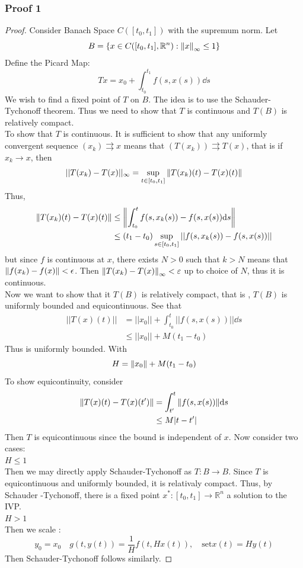 \documentclass[a4paper, 12pt]{book}
\begin{document}
\subsubsection{Proof 1}
\begin{proof}
	Consider Banach Space \( C([t_0,t_1]) \) with the supremum norm. Let \[
		B=\{x\in C([t_0,t_1], \mathbb{R}^n): \norm{x} _\infty \leq 1\}
	\]
	Define the Picard Map:
	\[
		Tx=x_0+\int_{t_0}^{t_1} f(s,x(s)) \dd s
	\]
	We wish to find a fixed point of \( T \) on \( B \). The idea is to use the Schauder-Tychonoff theorem. Thus we need to show that \( T \) is continuous and \( T(B) \) is relatively compact. \\

	To show that \( T \) is continuous. It is sufficient to show that any uniformly convergent sequence \( (x_k)\rightrightarrows x \) means that \( (T(x_k))
	\rightrightarrows T(x)\), that is if \( x_k \to x \), then
	\[
		||T(x_k)-T(x)||_\infty=\sup_{t\in[t_0, t_1]} \norm{T(x_k)(t)-T(x)(t)}
	\]
	Thus,
	\begin{align*}
		\norm{T(x_k)(t)-T(x)(t)} & \leq \norm{\int_{t_0}^{t} f(s,x_k(s))-f(s,x(s))\dd s}         \\
		                         & \leq (t_1-t_0) \sup_{s\in[t_0,t_1]} ||f(s,x_k(s))-f(s,x(s))||
	\end{align*}
	but since \( f \) is continuous at \( x \), there exists \( N>0 \) such that \( k>N \) means that \( \norm{f(x_k)-f(x)} <\epsilon \). Then \( \norm{T(x_k)-T(x)} _\infty < \varepsilon \) up to choice of \( N \), thus it is continuous. \\
	Now we want to show that it \( T(B) \) is relatively compact, that is , \( T(B) \) is uniformly bounded and equicontinuous. See that
	\begin{align*}
		||T(x)(t)|| & = ||x_0|| + \int_{t_0}^{t} ||f(s, x(s))||\dd s \\
		            & \leq ||x_0|| +M(t_1-t_0)
	\end{align*}
	Thus is uniformly bounded. With \[
		H=\norm{x_0} +M(t_1-t_0)
	\] To show equicontinuity, consider
	\begin{align*}
		\norm{T(x)(t)-T(x)(t^\prime)} & =\int_{t^\prime}^{t} \norm{f(s,x(s))} \dd s \\
		                              & \leq M|t-t^\prime|
	\end{align*}
	Then \( T \) is equicontinuous since the bound is independent of \( x \).
	Now consider two cases:
	\\
	\textbf{\( H\leq 1 \)}\\
	Then we may directly apply Schauder-Tychonoff as \( T:B \to B \). Since \( T \) is equicontinuous and uniformly bounded, it is relativaly compact. Thus, by Schauder -Tychonoff, there is a fixed point \( x^*:[t_0,t_1]\to \mathbb{R}^n \) a solution to the IVP. \\
	\textbf{\( H>1 \)}\\
	Then we scale :
	\[
		y_0=x_0 \quad g(t,y(t))=\frac{1}{H} f(t, H x(t)), \quad \text{set} x(t)=Hy(t)
	\]
	Then Schauder-Tychonoff follows similarly.
\end{proof}
\end{document}
